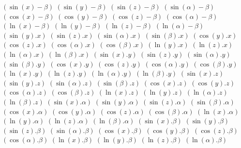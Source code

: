 $ (\sin(x) - \beta) $
$ (\sin(y) - \beta) $
$ (\sin(z) - \beta) $
$ (\sin(\alpha) - \beta) $
$ (\cos(x) - \beta) $
$ (\cos(y) - \beta) $
$ (\cos(z) - \beta) $
$ (\cos(\alpha) - \beta) $
$ (\ln(x) - \beta) $
$ (\ln(y) - \beta) $
$ (\ln(z) - \beta) $
$ (\ln(\alpha) - \beta) $
$ (\sin(y) . x) $
$ (\sin(z) . x) $
$ (\sin(\alpha) . x) $
$ (\sin(\beta) . x) $
$ (\cos(y) . x) $
$ (\cos(z) . x) $
$ (\cos(\alpha) . x) $
$ (\cos(\beta) . x) $
$ (\ln(y) . x) $
$ (\ln(z) . x) $
$ (\ln(\alpha) . x) $
$ (\ln(\beta) . x) $
$ (\sin(x) . y) $
$ (\sin(z) . y) $
$ (\sin(\alpha) . y) $
$ (\sin(\beta) . y) $
$ (\cos(x) . y) $
$ (\cos(z) . y) $
$ (\cos(\alpha) . y) $
$ (\cos(\beta) . y) $
$ (\ln(x) . y) $
$ (\ln(z) . y) $
$ (\ln(\alpha) . y) $
$ (\ln(\beta) . y) $
$ (\sin(x) . z) $
$ (\sin(y) . z) $
$ (\sin(\alpha) . z) $
$ (\sin(\beta) . z) $
$ (\cos(x) . z) $
$ (\cos(y) . z) $
$ (\cos(\alpha) . z) $
$ (\cos(\beta) . z) $
$ (\ln(x) . z) $
$ (\ln(y) . z) $
$ (\ln(\alpha) . z) $
$ (\ln(\beta) . z) $
$ (\sin(x) . \alpha) $
$ (\sin(y) . \alpha) $
$ (\sin(z) . \alpha) $
$ (\sin(\beta) . \alpha) $
$ (\cos(x) . \alpha) $
$ (\cos(y) . \alpha) $
$ (\cos(z) . \alpha) $
$ (\cos(\beta) . \alpha) $
$ (\ln(x) . \alpha) $
$ (\ln(y) . \alpha) $
$ (\ln(z) . \alpha) $
$ (\ln(\beta) . \alpha) $
$ (\sin(x) . \beta) $
$ (\sin(y) . \beta) $
$ (\sin(z) . \beta) $
$ (\sin(\alpha) . \beta) $
$ (\cos(x) . \beta) $
$ (\cos(y) . \beta) $
$ (\cos(z) . \beta) $
$ (\cos(\alpha) . \beta) $
$ (\ln(x) . \beta) $
$ (\ln(y) . \beta) $
$ (\ln(z) . \beta) $
$ (\ln(\alpha) . \beta) $
